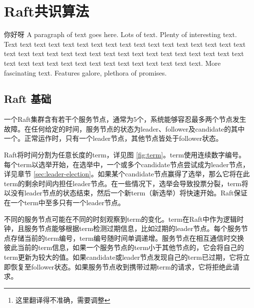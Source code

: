 \begin{abstract}
  Raft是一种管理复制日志的共识算法，它提供了和(multi-)Paxos等效的结果，且它和Paxos一样有效，但结构不同于Paxos，这使得Raft更易理解，且能够为构建实际系统提供更好的基础。为了提高可理解性，Raft将共识划分为Leader选举、日志复制及安全性等核心模块，并且它加强了一致性以减少需要考虑的状态。用户研究表明，对于学生而言，Raft相交于Paxos更易理解。Raft还提供了一种用于改变集群成员的新机制，其使用重叠大多数（overlapping majorities）\footnote{这里翻译得不准确，需要调整}来保证安全性。
\end{abstract}

\section{Raft共识算法}

你好呀
A paragraph of text goes here. Lots of text. Plenty of interesting
text. Text text text text text text text text text text text text text
text text text text text text text text text text text text text text
text text text text text text text text text text text text text text
text text text text text text text.
More fascinating text. Features galore, plethora of promises.

\subsection{Raft 基础}
一个Raft集群含有若干个服务节点，通常为$5$个，系统能够容忍最多两个节点发生故障。在任何给定的时间，服务节点的状态为leader、follower及candidate的其中一个。正常运作时，只有一个leader节点，其他节点皆处于follower状态。

Raft将时间分割为任意长度的term，详见图 \ref{fig:term}。term使用连续数字编号。每个term以选举开始，在选举中，一个或多个candidate节点尝试成为leader节点，详见章节 \ref{sec:leader-election}。如果某个candidate节点赢得了选举，那么它将在此term的剩余时间内担任leader节点。在一些情况下，选举会导致投票分裂，term将以没有leader节点的状态结束，然后一个新term（新选举）将快速开始。Raft保证在一个term中至多只有一个leader节点。

不同的服务节点可能在不同的时刻观察到term的变化。term在Raft中作为逻辑时钟\cite{10.1145/3335772.3335934}，且服务节点能够根据term检测过期信息，比如过期的leader节点。每个服务节点存储当前的term编号，term编号随时间单调递增。服务节点在相互通信时交换彼此当前的term信息，如果一个服务节点的term小于其他节点的，它会将自己的term更新为较大的值。如果candidate或leader节点发现自己的term已过期，它将立即恢复至follower状态。如果服务节点收到携带过期term的请求，它将拒绝此请求。

